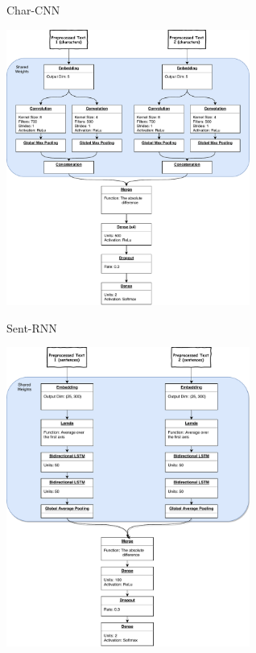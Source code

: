 \documentclass[10pt]{beamer}
\begin{document}
\begin{frame}[fragile]{Char-CNN}
    \begin{center}
        \includegraphics[width=0.6\textwidth]{../../report/pictures/experiments/conv_char_nn/model}
    \end{center}
\end{frame}

\begin{frame}[fragile]{Sent-RNN}
    \begin{center}
        \includegraphics[width=0.6\textwidth]{../../report/pictures/experiments/rec_sent_nn/model}
    \end{center}
\end{frame}
\end{document}

